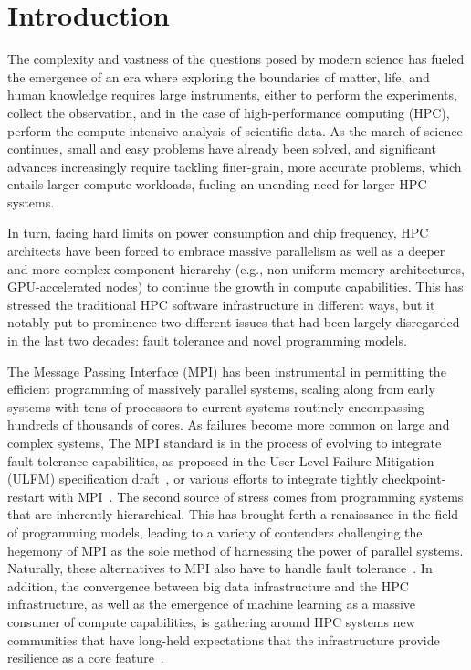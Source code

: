 \documentclass[sigconf]{acmart}
\newcommand{\ulfm}[0]{\textsc{ULFM}\xspace}
\newcommand{\mpi}[0]{\textsc{MPI}\xspace}
\begin{document}
\section{Introduction}\label{sec:intro}

The complexity and vastness of the questions posed by modern science has
fueled the emergence of an era where exploring the boundaries of matter, life,
and human knowledge requires large instruments, either to perform the
experiments, collect the observation, and in the
case of high-performance computing (HPC), perform the compute-intensive
analysis of scientific data. As the march of science continues, small and
easy problems have already been solved, and significant advances increasingly
require tackling finer-grain, more accurate problems, which entails larger compute workloads, fueling an unending need for larger
HPC systems.

In turn, facing hard limits on power consumption and chip frequency,
HPC architects have been forced to embrace massive parallelism as well as
a deeper and more complex component hierarchy (e.g., non-uniform memory architectures,
GPU-accelerated nodes) to continue the growth in compute capabilities.
This has stressed the traditional HPC software infrastructure in different
ways, but it notably put to prominence two different issues that had been
largely disregarded in the last two decades: fault tolerance and novel programming
models.

The Message Passing Interface (MPI) has been instrumental in
permitting the efficient programming of massively parallel systems, scaling
along from early systems with tens of processors to current systems routinely
encompassing hundreds of thousands of cores. As failures become more
common on large and complex systems, The \mpi standard is in the process of
evolving to integrate fault tolerance capabilities, as proposed in the
User-Level Failure Mitigation (\ulfm) specification draft~\cite{Bland2013}, or
various efforts to integrate tightly checkpoint-restart with \mpi~\cite{reinit18}.
The second source of stress comes from programming systems that are inherently
hierarchical. This has brought forth a renaissance in the field of
programming models, leading to a variety of contenders challenging the
hegemony of \mpi as the sole method of harnessing the power of parallel systems.
Naturally, these alternatives to \mpi also have to handle fault tolerance~\cite{7161563, doi:10.1177/1094342016669416, shmem-ft15, 10.1007/978-3-319-50995-2_5, X10-ft16}.
In addition, the convergence
between big data infrastructure and the HPC infrastructure, as well as
the emergence of machine learning as a massive consumer of compute
capabilities, is gathering around HPC systems new communities that
have long-held expectations that the infrastructure provide resilience as a core feature~\cite{hadoop-ft}.
\end{document}
